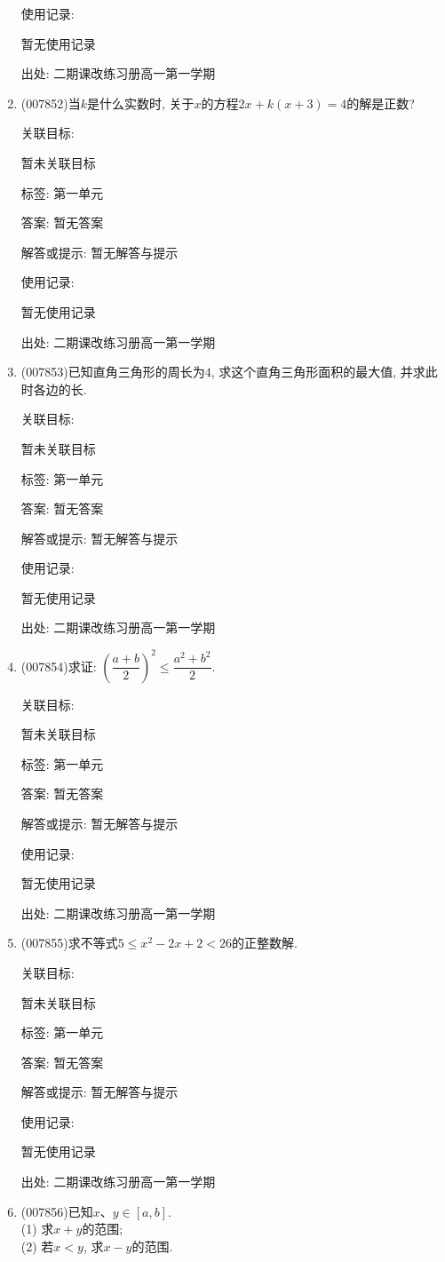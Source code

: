 \documentclass[10pt,a4paper]{article}
\begin{document}
\begin{enumerate}[1.]
使用记录:

暂无使用记录


出处: 二期课改练习册高一第一学期
\item { (007852)}当$k$是什么实数时, 关于$x$的方程$2x+k(x+3)=4$的解是正数?


关联目标:

暂未关联目标



标签: 第一单元

答案: 暂无答案

解答或提示: 暂无解答与提示

使用记录:

暂无使用记录


出处: 二期课改练习册高一第一学期
\item { (007853)}已知直角三角形的周长为$4$, 求这个直角三角形面积的最大值, 并求此时各边的长.


关联目标:

暂未关联目标



标签: 第一单元

答案: 暂无答案

解答或提示: 暂无解答与提示

使用记录:

暂无使用记录


出处: 二期课改练习册高一第一学期
\item { (007854)}求证: $(\dfrac{a+b}2)^2\le \dfrac{a^2+b^2}2$.


关联目标:

暂未关联目标



标签: 第一单元

答案: 暂无答案

解答或提示: 暂无解答与提示

使用记录:

暂无使用记录


出处: 二期课改练习册高一第一学期
\item { (007855)}求不等式$5\le x^2-2x+2<26$的正整数解.


关联目标:

暂未关联目标



标签: 第一单元

答案: 暂无答案

解答或提示: 暂无解答与提示

使用记录:

暂无使用记录


出处: 二期课改练习册高一第一学期
\item { (007856)}已知$x$、$y\in [a,b]$.\\
(1) 求$x+y$的范围;\\
(2) 若$x<y$, 求$x-y$的范围.



\end{enumerate}
\end{document}
